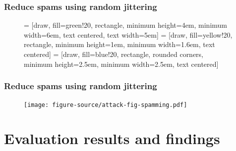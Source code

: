 \documentclass[aspectratio=169]{beamer}
\begin{document}
\begin{frame}
    \frametitle{Reduce spams using random jittering}
    \begin{figure}
         = [draw, fill=green!20, rectangle, 
        minimum height=4em, minimum width=6em, text centered, text width=5em]
         = [draw, fill=yellow!20, rectangle, minimum height=1em, minimum width=1.6em, text centered]
         = [draw, fill=blue!20, rectangle, rounded corners, minimum height=2.5em, minimum width=2.5em, text centered]
    \end{figure}
\end{frame}

\begin{frame}
    \frametitle{Reduce spams using random jittering}
    \begin{figure}
        \centering
        \texttt{[image: figure-source/attack-fig-spamming.pdf]}
    \end{figure}
\end{frame}

\section{Evaluation results and findings}


\begin{frame}
\end{frame}
\end{document}
